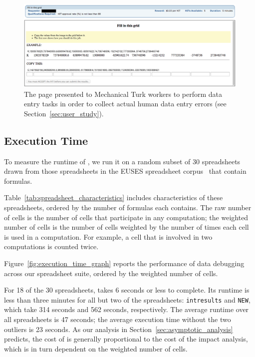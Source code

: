 \begin{figure}[!t]
\centering
\includegraphics[width=6.5in]{images/mturk_fuzz_task}
  \caption{The page presented to Mechanical Turk workers to perform data entry tasks in order to collect actual human data entry errors (see Section~\ref{sec:user_study}).\label{fig:mturk_task}}
\end{figure}

\subsection{Execution Time}
\label{sec:execution_time}

To measure the runtime of \checkcell{}, we run it on a random subset
of 30 spreadsheets drawn from those spreadsheets in the EUSES
spreadsheet corpus~\cite{Fisher:2005:ESC:1082983.1083242} that contain
formulas.

Table~\ref{tab:spreadsheet_characteristics} includes
characteristics of these spreadsheets, ordered by the number of
formulas each contains. The raw number of cells is the number of cells
that participate in any computation; the weighted number of cells is
the number of cells weighted by the number of times each cell is used
in a computation. For example, a cell that is involved in two
computations is counted twice.

Figure~\ref{fig:execution_time_graph} reports the performance of data
debugging across our spreadsheet suite, ordered by the weighted number
of cells.

For 18 of the 30 spreadsheets, \checkcell{} takes 6 seconds or less to
complete. Its runtime is less than three minutes for all but two of
the spreadsheets: \texttt{intresults} and \texttt{NEW}, which take 314
seconds and 562 seconds, respectively. The average runtime over all
spreadsheets is 47 seconds; the average execution time without the two
outliers is 23 seconds. As our analysis in
Section~\ref{sec:asymptotic_analysis} predicts, the cost
of \checkcell{} is generally proportional to the cost of the impact
analysis, which is in turn dependent on the weighted number of cells.

